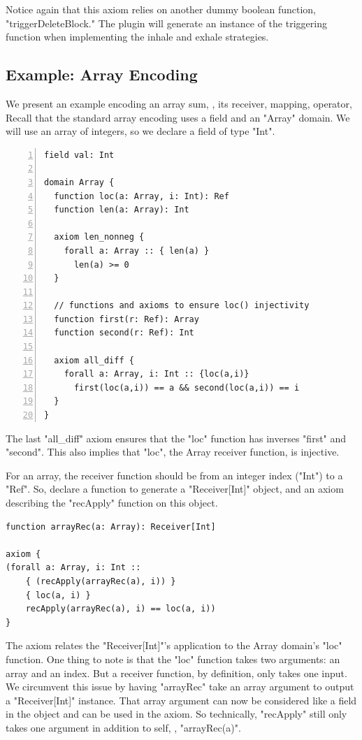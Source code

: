 \documentclass[msc,oneside]{ubcthesis}
\theoremstyle{definition}
\begin{document}
Notice again that this axiom relies on another dummy boolean function, "triggerDeleteBlock." The plugin will generate an instance of the triggering function when implementing the inhale and exhale strategies. 

\subsection{Example: Array Encoding}
We present an example encoding an array sum, \ie, its receiver, mapping, operator, \etc Recall that the standard array encoding uses a field and an "Array" domain. We will use an array of integers, so we declare a field of type "Int".
\begin{lstlisting}[language=silver,numbers=left, firstnumber=1, stepnumber=1]
field val: Int

domain Array {
  function loc(a: Array, i: Int): Ref
  function len(a: Array): Int

  axiom len_nonneg {
    forall a: Array :: { len(a) }
      len(a) >= 0
  }

  // functions and axioms to ensure loc() injectivity
  function first(r: Ref): Array
  function second(r: Ref): Int  

  axiom all_diff {
    forall a: Array, i: Int :: {loc(a,i)}
      first(loc(a,i)) == a && second(loc(a,i)) == i
  }
}
\end{lstlisting}
The last "all_diff" axiom ensures that the "loc" function has inverses "first" and "second". This also implies that "loc", the Array receiver function, is injective. 

For an array, the receiver function should be from an integer index ("Int") to a "Ref". So, declare a function to generate a "Receiver[Int]" object, and an axiom describing the "recApply" function on this object.
\begin{lstlisting}
function arrayRec(a: Array): Receiver[Int] 

axiom {
(forall a: Array, i: Int ::
    { (recApply(arrayRec(a), i)) }
    { loc(a, i) }
    recApply(arrayRec(a), i) == loc(a, i))
}
\end{lstlisting}
The axiom relates the "Receiver[Int]"'s application to the Array domain's "loc" function. One thing to note is that the "loc" function takes two arguments: an array and an index. But a receiver function, by definition, only takes one input. We circumvent this issue by having "arrayRec" take an array argument to output a "Receiver[Int]" instance. That array argument can now be considered like a field in the object and can be used in the axiom. So technically, "recApply" still only takes one argument in addition to self, \ie, "arrayRec(a)".
\end{document}
